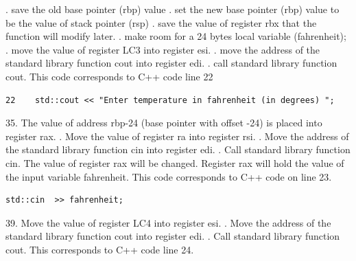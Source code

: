 \documentclass{article}
\theoremstyle{theorem}
\theoremstyle{definition}
\theoremstyle{remark}
\begin{document}
\newline {}. save the old base pointer (rbp) value
\newline {}. set the new base pointer (rbp) value to be the value of stack pointer (rsp)
\newline {}. save the value of register rbx that the function will modify later. 
\newline {}. make room for a 24 bytes local variable (fahrenheit);
\newline {}. move the value of register LC3 into register esi.
\newline {}. move the address of the standard library function cout into register edi.
\newline {}. call standard library function cout. This code corresponds to C++ code line 22
\begin{lstlisting}
22    std::cout << "Enter temperature in fahrenheit (in degrees) ";
\end{lstlisting}
35. The value of address rbp-24 (base pointer with offset -24) is placed into register rax.
\newline {}. Move the value of register ra into register rsi. 
\newline {}. Move the address of the standard library function cin into register edi.
\newline {}. Call standard library function cin. The value of register rax will be changed. Register rax will hold the value of the input variable fahrenheit. This code corresponds to C++ code on line 23.
\begin{lstlisting}
std::cin  >> fahrenheit;
\end{lstlisting}
39. Move the value of register LC4 into register esi. 
\newline {}. Move the address of the standard library function cout into register edi.
\newline {}. Call standard library function cout. This corresponds to C++ code line 24. 
\end{document}
